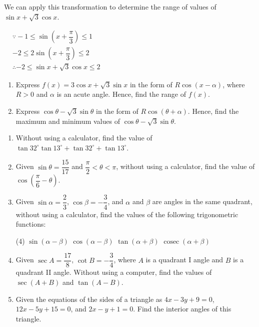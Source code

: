 \documentclass{report}
\begin{document}
We can apply this transformation to determine the range of values of $\sin x+\sqrt{3} \cos x$.

$\begin{aligned} & \because-1 \leq \sin \left(x+\dfrac{\pi}{3}\right) \leq 1 \\ & -2 \leq 2 \sin \left(x+\dfrac{\pi}{3}\right) \leq 2 \\ & \therefore-2 \leq \sin x+\sqrt{3} \cos x \leq 2\end{aligned}$

\vspace{-1em}
\begin{enumerate}
	\item Express $f(x)=3 \cos x+\sqrt{3} \sin x$ in the form of $R \cos (x-\alpha)$, where $R>0$ and $\alpha$ is an acute angle. Hence, find the range of $f(x)$.
	\item Express $\cos \theta-\sqrt{3} \sin \theta$ in the form of $R \cos (\theta+\alpha)$. Hence, find the maximum and minimum values of $\cos \theta-\sqrt{3} \sin \theta$.
\end{enumerate}

\vspace{-1em}
\begin{enumerate}
	\item Without using a calculator, find the value of $\tan 32^{\circ} \tan 13^{\circ}+\tan 32^{\circ}+\tan 13^{\circ}$.
	\item Given $\sin \theta=\dfrac{15}{17}$ and $\dfrac{\pi}{2}<\theta<\pi$, without using a calculator, find the value of $\cos \left(\dfrac{\pi}{6}-\theta\right)$.
	\item Given $\sin \alpha=\dfrac{2}{3}$, $\cos \beta=-\dfrac{3}{4}$, and $\alpha$ and $\beta$ are angles in the same quadrant, without using a calculator, find the values of the following trigonometric functions:
	      \begin{tasks}[label=(\alph*)](4)
	      	\task $\sin (\alpha-\beta)$
	      	\task $\cos (\alpha-\beta)$
	      	\task $\tan (\alpha+\beta)$
	      	\task $\operatorname{cosec}(\alpha+\beta)$
	      \end{tasks}
	      
	\item Given $\sec A=\dfrac{17}{8}$, $\cot B=-\dfrac{3}{4}$, where $A$ is a quadrant I angle and $B$ is a quadrant II angle. Without using a computer, find the values of $\sec (A+B)$ and $\tan (A-B)$.
	\item Given the equations of the sides of a triangle as $4x-3y+9=0$, $12x-5y+15=0$, and $2x-y+1=0$. Find the interior angles of this triangle.
	              
\end{enumerate}
\vspace{-1em}
\end{document}
